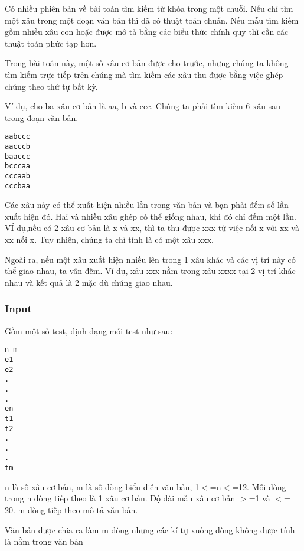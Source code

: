 





   Có nhiều phiên bản về bài toán tìm kiếm từ khóa trong một chuỗi.  Nếu chỉ tìm một xâu trong một đoạn văn bản thì đã có thuật toán chuẩn. Nếu mẫu tìm kiếm gồm nhiều xâu con hoặc được mô tả bằng các biểu thức chính quy thì cần các thuật toán phức tạp hơn.  

   Trong bài toán này, một số xâu cơ bản được cho trước, nhưng chúng ta không tìm kiếm trực tiếp trên chúng mà tìm kiếm các xâu thu được bằng việc ghép chúng theo thứ tự bất kỳ.  

   Ví dụ, cho ba xâu cơ bản là aa, b và ccc. Chúng ta phải tìm kiếm 6 xâu sau trong đoạn văn bản.  
\begin{verbatim}
aabccc
aacccb
baaccc
bcccaa
cccaab
cccbaa
\end{verbatim}

   Các xâu này có thể xuất hiện nhiều lần trong văn bản và bạn phải đếm số lần xuất hiện đó. Hai và nhiều xâu ghép có thể giống nhau, khi đó chỉ đếm một lần. VÍ dụ,nếu có 2 xâu cơ bản là x và xx, thì ta thu được xxx từ việc nối x với xx và xx nối x. Tuy nhiên, chúng ta chỉ tính là có một xâu xxx.  

   Ngoài ra, nếu một xâu xuất hiện nhiều lên trong 1 xâu khác và các vị trí này có thể giao nhau, ta vẫn đếm. Ví dụ, xâu xxx nằm trong xâu xxxx tại 2 vị trí khác nhau và kết quả là 2 mặc dù chúng giao nhau.  



\subsubsection{   Input  }



   Gồm một số test, định dạng mỗi test như sau:  
\begin{verbatim}
n m
e1
e2
.
.
.
en
t1
t2
.
.
.
tm
\end{verbatim}

   n là số xâu cơ bản, m là số dòng biểu diễn văn bản, 1$<$=n$<$=12. Mỗi dòng trong n dòng tiếp theo là 1 xâu cơ bản. Độ dài mẫu xâu cơ bản $>$=1 và $<$= 20. m dòng tiếp theo mô tả văn bản.  

   Văn bản được chia ra làm m dòng nhưng các kí tự xuống dòng không được tính là nằm trong văn bản  

